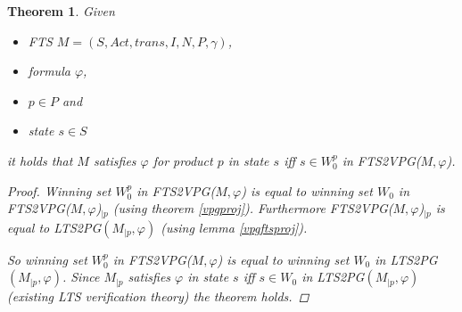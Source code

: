 \documentclass[]{article}
\newtheorem{theorem}{Theorem}[section]
\begin{document}
\begin{theorem}
	Given
	\begin{itemize}
		\item FTS $M = (S, Act, trans, I, N, P, \gamma)$,
		\item formula $\varphi$,
		\item $p \in P$ and
		\item state $s \in S$
	\end{itemize}
it holds that $M$ satisfies $\varphi$ for product $p$ in state $s$ iff $s \in W_0^p$ in FTS2VPG($M, \varphi$).
\begin{proof}
	
	Winning set $W_0^p$ in FTS2VPG($M, \varphi$) is equal to winning set $W_0$ in FTS2VPG($M, \varphi$)$_{|p}$ (using theorem \ref{vpgproj}). Furthermore FTS2VPG($M, \varphi$)$_{|p}$ is equal to LTS2PG$(M_{|p}, \varphi)$ (using lemma \ref{vpgftsproj}).
	
	So winning set  $W_0^p$ in FTS2VPG($M, \varphi$) is equal to winning set $W_0$ in LTS2PG$(M_{|p}, \varphi)$.
	Since $M_{|p}$ satisfies $\varphi$ in state $s$ iff $s \in W_0$ in LTS2PG$(M_{|p}, \varphi)$ (existing LTS verification theory) the theorem holds.
\end{proof}
\end{theorem}
 

\end{document}
